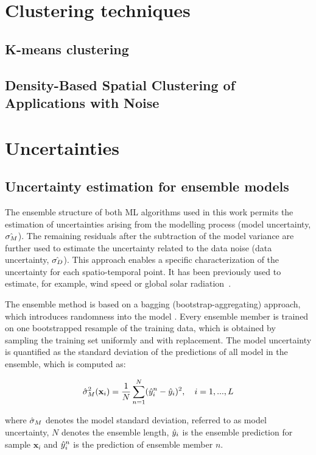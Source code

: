  
\section{Clustering techniques}
\subsection{K-means clustering}
\subsection{Density-Based Spatial Clustering of Applications with Noise}


\section{Uncertainties}
\subsection{Uncertainty estimation for ensemble models}
\label{unc_ML}

The ensemble structure of both ML algorithms used in this work permits the estimation of uncertainties arising from the modelling process (model uncertainty, $\Hat{\sigma_M}$). The remaining residuals after the subtraction of the model variance are further used to estimate the uncertainty related to the data noise (data uncertainty, $\Hat{\sigma_D}$). 
This approach enables a specific characterization of the uncertainty for each spatio-temporal point.
It has been previously used to estimate, for example, wind speed or global solar radiation~\cite{walch_spatio-temporal_2019, wan_probabilistic_2014}.

The ensemble method is based on a bagging (bootstrap-aggregating) approach, which introduces randomness into the model  \cite{breiman_bagging_1996}.
Every ensemble member is trained on one bootstrapped resample of the training data, which is
obtained by sampling the training set uniformly and with replacement.
The model uncertainty is quantified as the standard deviation of the predictions of all model in the ensemble, which is computed as:

\begin{equation}
\label{eq:model_unc}
  \Hat{\sigma}_M^2 (\mathbf{x}_i) = \frac{1}{N} \sum_{n=1}^N (\Hat{y}_i^n - \Hat{y}_i)^2, \quad i=1,...,L
\end{equation}

where $\Hat{\sigma}_M$ denotes the model standard deviation, referred to as model uncertainty, $N$ denotes the ensemble length, $\Hat{y}_i$ is the ensemble prediction for sample $\mathbf{x}_i$ and $\Hat{y}_i^n$ is the prediction of ensemble member $n$.

